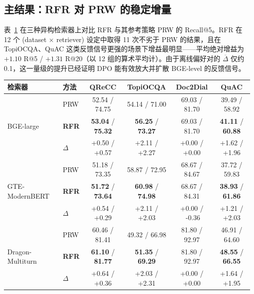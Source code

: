 \subsection{主结果：RFR 对 PRW 的稳定增量}

表~\ref{tab:rfr_main_prw} 在三种异构检索器上对比 RFR 与其参考策略 PRW 的 Recall@5。RFR 在 12 个 (dataset $\times$ retriever) 设定中取得 11 次不劣于 PRW 的结果，且在 TopiOCQA、QuAC 这类反馈信号更强的场景下增益最明显——平均绝对增益为 $\mathbf{+1.10}$ R@5 / $\mathbf{+1.31}$ R@20（以 12 组的算术平均计）。由于离线偏好对的 $\overline{\Delta}$ 仅约 0.1，这一量级的提升已经证明 DPO 能有效放大并扩散 BGE-level 的反馈信号。

\begin{table}[h]
\centering
{}
\label{tab:rfr_main_prw}
\small
\begin{tabular}{llcccc}
\toprule
检索器 & 方法 & QReCC & TopiOCQA & Doc2Dial & QuAC \\
\midrule
\multirow{3}{*}{BGE-large}
 & PRW & 52.54 / 74.75 & 54.14 / 71.00 & 69.03 / 81.70 & 39.49 / 58.92 \\
 & \textbf{RFR} & \textbf{53.04} / \textbf{75.32} & \textbf{56.25} / \textbf{73.27} & 69.03 / 81.70 & \textbf{41.11} / \textbf{60.88} \\
 & $\Delta$ & +0.50 / +0.57 & +2.11 / +2.27 & +0.00 / +0.00 & +1.62 / +1.96 \\
\midrule
\multirow{3}{*}{GTE-ModernBERT}
 & PRW & 51.18 / 73.35 & 58.87 / 72.95 & 68.67 / 84.67 & 37.72 / 59.83 \\
 & \textbf{RFR} & \textbf{51.72} / \textbf{73.64} & \textbf{60.98} / \textbf{74.98} & 68.67 / 84.31 & \textbf{38.93} / \textbf{61.86} \\
 & $\Delta$ & +0.54 / +0.29 & +2.11 / +2.03 & +0.00 / \,\,-0.36 & +1.21 / +2.03 \\
\midrule
\multirow{3}{*}{Dragon-Multiturn}
 & PRW & 60.46 / 81.41 & 49.32 / 66.98 & 81.80 / 92.97 & 46.91 / 64.60 \\
 & \textbf{RFR} & \textbf{61.10} / \textbf{81.77} & \textbf{51.35} / \textbf{69.29} & 81.80 / 92.97 & \textbf{48.55} / \textbf{66.55} \\
 & $\Delta$ & +0.64 / +0.36 & +2.03 / +2.31 & +0.00 / +0.00 & +1.64 / +1.95 \\
\bottomrule
\end{tabular}
\end{table}

